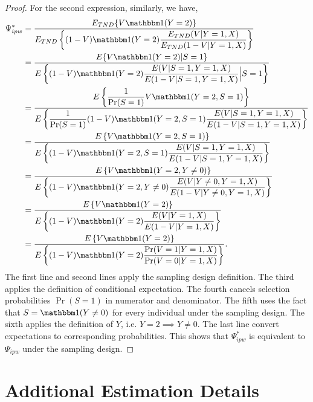 \begin{appendix}
\begin{refsection}
\begin{proof}
    For the second expression, similarly, we have,
    \begin{align*}
        \Psi^*_{ipw} &= \dfrac{E_{TND}\{V \mathbbm 1 (Y =2)\}}{E_{TND}\left\{(1 - V)\mathbbm 1 (Y = 2) \dfrac{ E_{TND}(V | Y = 1, X)}{ E_{TND}(1-V | Y = 1, X)}\right\}} \\
        &= \dfrac{E\{V \mathbbm 1 (Y =2) | S =1\}}{E\left\{(1 - V)\mathbbm 1 (Y = 2) \dfrac{ E(V | S= 1, Y = 1, X)}{ E(1-V | S = 1, Y = 1, X)}\Big| S = 1\right\}} \\
        &= \dfrac{E\left\{\dfrac{1}{\Pr(S=1)} V \mathbbm 1 (Y =2, S=1) \right\}}{E\left\{\dfrac{1}{\Pr(S=1)}(1 - V)\mathbbm 1 (Y = 2, S = 1) \dfrac{ E(V | S= 1, Y = 1, X)}{ E(1-V | S = 1, Y = 1, X)}\right\}} \\
        &= \dfrac{E\left\{ V \mathbbm 1 (Y =2, S=1) \right\}}{E\left\{(1 - V)\mathbbm 1 (Y = 2, S = 1) \dfrac{ E(V | S= 1, Y = 1, X)}{ E(1-V | S = 1, Y = 1, X)}\right\}} \\
        &= \dfrac{E\left\{ V \mathbbm 1 (Y =2, Y\neq0) \right\}}{E\left\{(1 - V)\mathbbm 1 (Y = 2, Y\neq0) \dfrac{ E(V | Y\neq0, Y = 1, X)}{ E(1-V | Y\neq0, Y = 1, X)}\right\}} \\
        &= \dfrac{E\left\{ V \mathbbm 1 (Y =2) \right\}}{E\left\{(1 - V)\mathbbm 1 (Y = 2) \dfrac{ E(V | Y = 1, X)}{ E(1-V | Y = 1, X)}\right\}} \\
        &= \dfrac{E\left\{ V \mathbbm 1 (Y =2) \right\}}{E\left\{(1 - V)\mathbbm 1 (Y = 2) \dfrac{ \Pr(V=1 | Y = 1, X)}{ \Pr(V=0 | Y = 1, X)}\right\}} .
    \end{align*}
    The first line and second lines apply the sampling design definition. The third applies the definition of conditional expectation. The fourth cancels selection probabilities $\Pr(S=1)$ in numerator and denominator. The fifth uses the fact that $S = \mathbbm 1(Y \neq 0)$ for every individual under the sampling design. The sixth applies the definition of $Y$, i.e. $Y = 2 \implies Y \neq 0$. The last line convert expectations to corresponding probabilities. This shows that $\Psi^*_{ipw}$ is equivalent to $\Psi_{ipw}$ under the sampling design.
    
    \end{proof}
    
    \newpage
    \section{Additional Estimation Details}\label{sec:app_estimation}

\end{refsection}
\end{appendix}
